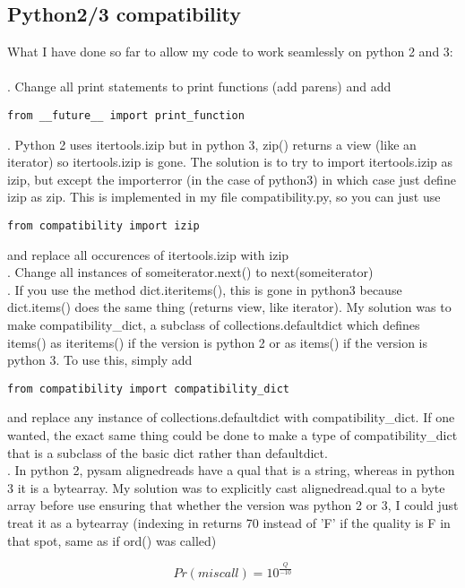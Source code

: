 \documentclass[11pt]{article}
\begin{document}
\subsection*{Python2/3 compatibility}
What I have done so far to allow my code to work seamlessly on python 2 and 3:\\
\\
. Change all print statements to print functions (add parens) and add
\begin{verbatim}
from __future__ import print_function
\end{verbatim}
. Python 2 uses itertools.izip but in python 3, zip() returns a view (like an iterator) so itertools.izip is gone. The solution is to try to import itertools.izip as izip, but except the importerror (in the case of python3) in which case just define izip as zip.
This is implemented in my file compatibility.py, so you can just use
\begin{verbatim}
from compatibility import izip
\end{verbatim}
and replace all occurences of itertools.izip with izip
\\
. Change all instances of someiterator.next() to next(someiterator)
\\
. If you use the method dict.iteritems(), this is gone in python3 because dict.items() does the same thing (returns view, like iterator). My solution was to make compatibility\_dict, a subclass of collections.defaultdict which defines items() as iteritems() if the version is python 2 or as items() if the version is python 3. To use this, simply add
\begin{verbatim}
from compatibility import compatibility_dict
\end{verbatim}
and replace any instance of collections.defaultdict with compatibility\_dict. If one wanted, the exact same thing could be done to make a type of compatibility\_dict that is a subclass of the basic dict rather than defaultdict.
\\
. In python 2, pysam alignedreads have a qual that is a string, whereas in python 3 it is a bytearray. My solution was to explicitly cast alignedread.qual to a byte array before use ensuring that whether the version was python 2 or 3, I could just treat it as a bytearray (indexing in returns 70 instead of 'F' if the quality is F in that spot, same as if ord() was called)

\begin{equation*}
Pr(miscall) = 10^\frac{Q}{-10}
\end{equation*}
\end{document}
